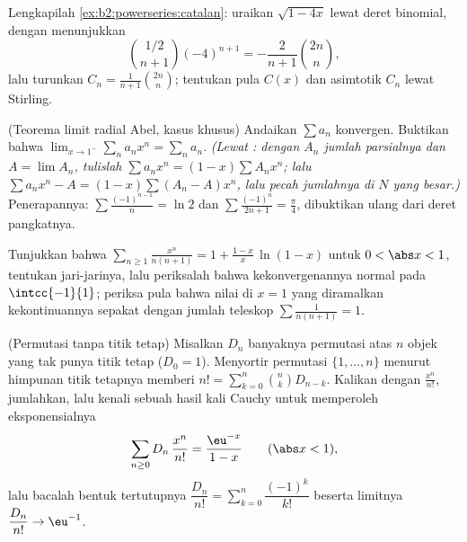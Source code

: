 \begin{exercise}[$\star\star\star$]\label{exo:b2:powerseries:8}
Lengkapilah \cref{ex:b2:powerseries:catalan}: uraikan $\sqrt{1 - 4x}$
lewat deret binomial, dengan menunjukkan
\[
\binom{1/2}{n+1}(-4)^{n+1} = -\frac{2}{n+1}\binom{2n}{n},
\]
lalu turunkan $C_n = \frac{1}{n+1}\binom{2n}{n}$; tentukan pula
 $C(x)$ dan asimtotik $C_n$ lewat
Stirling.
\end{exercise}

\begin{exercise}[$\star\star\star$]\label{exo:b2:powerseries:9}
(Teorema limit radial Abel, kasus khusus) Andaikan $\sum a_n$
konvergen. Buktikan bahwa $\lim_{x \to 1^-} \sum_{n} a_n x^n = \sum_n
a_n$. \emph{(Lewat : dengan $A_n$ jumlah parsialnya dan
$A = \lim A_n$, tulislah $\sum a_nx^n = (1 - x)\sum A_n x^n$; lalu $\sum
a_nx^n - A = (1-x)\sum (A_n - A)x^n$, lalu pecah jumlahnya di $N$ yang
besar.)} Penerapannya: $\sum \frac{(-1)^{n-1}}{n} = \ln 2$ dan $\sum
\frac{(-1)^n}{2n+1} = \frac\pi4$, dibuktikan ulang dari deret pangkatnya.
\end{exercise}

\begin{exercise}[$\star$]\label{exo:b2:powerseries:10}
Tunjukkan bahwa $\displaystyle\sum_{n\geq1}\frac{x^n}{n(n+1)} = 1 +
\frac{1-x}{x}\,\ln(1-x)$ untuk $0 < \abs x < 1$, tentukan
jari-jarinya, lalu periksalah bahwa kekonvergenannya normal pada
$\intcc{-1}{1}$; periksa pula bahwa nilai di $x = 1$ yang diramalkan
kekontinuannya sepakat dengan jumlah teleskop $\sum
\frac{1}{n(n+1)} = 1$.
\end{exercise}

\begin{exercise}[$\star\star$]\label{exo:b2:powerseries:11}
(Permutasi tanpa titik tetap) Misalkan $D_n$ banyaknya permutasi atas
$n$ objek yang tak punya titik tetap ($D_0 = 1$). Menyortir
permutasi $\{1, \dots, n\}$ menurut himpunan titik tetapnya memberi
$n! = \sum_{k=0}^{n}\binom nk D_{n-k}$. Kalikan dengan
$\frac{x^n}{n!}$, jumlahkan, lalu kenali sebuah hasil kali Cauchy untuk
memperoleh  eksponensialnya
\[
\sum_{n\geq0} D_n\,\frac{x^n}{n!} = \frac{\eu^{-x}}{1-x}
\qquad (\abs x < 1),
\]
lalu bacalah bentuk tertutupnya $\dfrac{D_n}{n!} =
\sum_{k=0}^{n}\dfrac{(-1)^k}{k!}$ beserta limitnya $\dfrac{D_n}{n!}
\to \eu^{-1}$.
\end{exercise}


